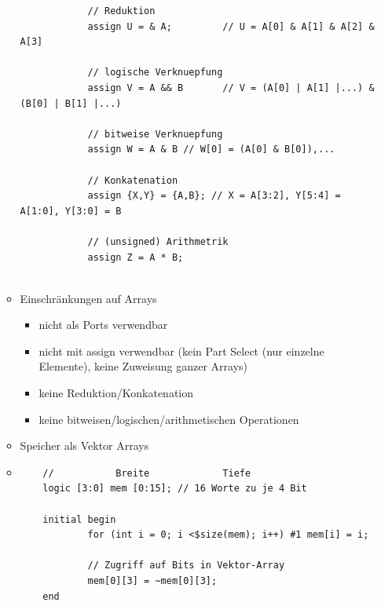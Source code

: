 \documentclass[11pt,a4paper]{article}
\begin{document}
\begin{itemize}
\begin{itemize}
\begin{lstlisting}
			// Reduktion
			assign U = & A; 		// U = A[0] & A[1] & A[2] & A[3]
			
			// logische Verknuepfung
			assign V = A && B 		// V = (A[0] | A[1] |...) & (B[0] | B[1] |...)
			
			// bitweise Verknuepfung 
			assign W = A & B // W[0] = (A[0] & B[0]),...
			
			// Konkatenation
			assign {X,Y} = {A,B}; // X = A[3:2], Y[5:4] = A[1:0], Y[3:0] = B
			
			// (unsigned) Arithmetrik
			assign Z = A * B;
			
		\end{lstlisting}
		
	\item Einschränkungen auf Arrays
		\begin{itemize}
		\item nicht als Ports verwendbar
		\item nicht mit assign verwendbar (kein Part Select (nur einzelne Elemente), keine Zuweisung ganzer Arrays)
		\item keine Reduktion/Konkatenation
		\item keine bitweisen/logischen/arithmetischen Operationen
		\end{itemize}
		
	\item Speicher als Vektor Arrays
	\item[]
	\begin{lstlisting}
	//			 Breite 			Tiefe
	logic [3:0] mem [0:15]; // 16 Worte zu je 4 Bit
	
	initial begin 
			for (int i = 0; i <$size(mem); i++) #1 mem[i] = i; 
			
			// Zugriff auf Bits in Vektor-Array
			mem[0][3] = ~mem[0][3];
	end
	\end{lstlisting}
	\end{itemize}

\end{itemize}
\end{document}
